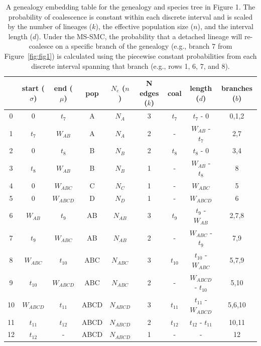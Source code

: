 \documentclass[11pt]{article}
\begin{document}
\begin{table}[t]
\centering
\caption{
	A genealogy embedding table for the genealogy and species tree in Figure 1. 
	The probability of coalescence is constant within each discrete interval 
	and is scaled by the number of lineages ($k$), the effective population size ($n$), 
	and the interval length ($d$).
	Under the MS-SMC, the probability that a detached lineage will re-coalesce
	on a specific branch of the genealogy (e.g., branch 7 from Figure~\ref{fig:fig1})
	is calculated using the piecewise constant probabilities from each 
	discrete interval spanning that branch (e.g., rows 1, 6, 7, and 8).
}
\begin{tabular}[t]{ |c|c|c|c|c|c|c|c|c| }
	\toprule
	 & start ($\sigma$)  & end ($\mu$)  & pop & $N_e$ ($n$)  & N edges ($k$) & coal  & length ($d$) & branches ($b$) \\
	\midrule
	0 & 0          & $t_7$      & A   & $N_A$     & 3 & $t_7$    & $t_7$ - 0            & 0,1,2 \\
	1 & $t_7$      & $W_{AB}$   & A   & $N_A$     & 2 & -        & $W_{AB}$ - $t_7$     & 2,7   \\	
	2 & 0          & $t_8$      & B   & $N_B$     & 2 & $t_8$    & $t_8$ - 0            & 3,4   \\ 
	3 & $t_8$      & $W_{AB}$   & B   & $N_B$     & 1 & -        & $W_{AB}$ - $t_8$     & 8     \\
	4 & 0          & $W_{ABC}$  & C   & $N_C$     & 1 & -        & $W_{ABC}$            & 5     \\
	5 & 0          & $W_{ABCD}$ & D   & $N_D$     & 1 & -        & $W_{ABCD}$           & 6     \\
	6 & $W_{AB}$   & $t_9$      & AB  & $N_{AB}$  & 3 & $t_9$    & $t_9$ - $W_{AB}$     & 2,7,8 \\
	7 & $t_9$      & $W_{ABC}$  & AB  & $N_{AB}$  & 2 & -        & $W_{ABC}$ - $t_9$    & 7,9   \\
	8 & $W_{ABC}$  & $t_{10}$   & ABC & $N_{ABC}$ & 3 & $t_{10}$ & $t_{10}$ - $W_{ABC}$ & 5,7,9  \\
	9 & $t_{10}$   & $W_{ABCD}$ & ABC & $N_{ABC}$ & 2 & -        & $W_{ABCD}$ - $t_{10}$ & 5,10 \\
	10 & $W_{ABCD}$ & $t_{11}$  & ABCD & $N_{ABCD}$ & 3 & $t_{11}$ & $t_{11}$ - $W_{ABCD}$ & 5,6,10 \\
	11 & $t_{11}$  & $t_{12}$   & ABCD & $N_{ABCD}$ & 2 & $t_{12}$ & $t_{12}$ - $t_{11}$ & 10,11 \\
	12 & $t_{12}$  & -          & ABCD & $N_{ABCD}$ & 1 & -        & -                   & 12    \\	
	\bottomrule
\end{tabular}
\label{tab:table-1} 
\end{table}
\end{document}
